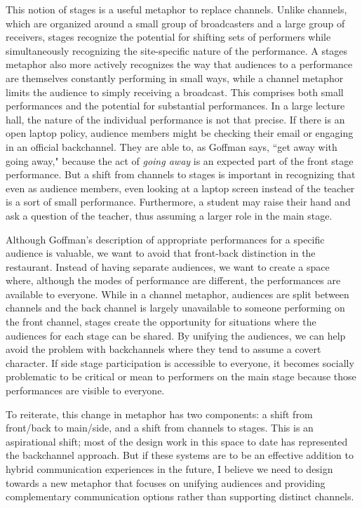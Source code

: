 This notion of stages is a useful metaphor to replace channels. Unlike channels, which are organized around a small group of broadcasters and a large group of receivers, stages recognize the potential for shifting sets of performers while simultaneously recognizing the site-specific nature of the performance. A stages metaphor also more actively recognizes the way that audiences to a performance are themselves constantly performing in small ways, while a channel metaphor limits the audience to simply receiving a broadcast. This comprises both small performances and the potential for substantial performances. In a large lecture hall, the nature of the individual performance is not that precise. If there is an open laptop policy, audience members might be checking their email or engaging in an official backchannel.  They are able to, as Goffman says, ``get away with going away," because the act of \emph{going away} is an expected part of the front stage performance. But a shift from channels to stages is important in recognizing that even as audience members, even looking at a laptop screen instead of the teacher is a sort of small performance. Furthermore, a student may raise their hand and ask a question of the teacher, thus assuming a larger role in the main stage. 

Although Goffman's description of appropriate performances for a specific audience is valuable, we want to avoid that front-back distinction in the restaurant. Instead of having separate audiences, we want to create a space where, although the modes of performance are different, the performances are available to everyone. While in a channel metaphor, audiences are split between channels and the back channel is largely unavailable to someone performing on the front channel, stages create the opportunity for situations where the audiences for each stage can be shared. By unifying the audiences, we can help avoid the problem with backchannels where they tend to assume a covert character. If side stage participation is accessible to everyone, it becomes socially problematic to be critical or mean to performers on the main stage because those performances are visible to everyone.

To reiterate, this change in metaphor has two components: a shift from front/back to main/side, and a shift from channels to stages. This is an aspirational shift; most of the design work in this space to date has represented the backchannel approach. But if these systems are to be an effective addition to hybrid communication experiences in the future, I believe we need to design towards a new metaphor that focuses on unifying audiences and providing complementary communication options rather than supporting distinct channels.


